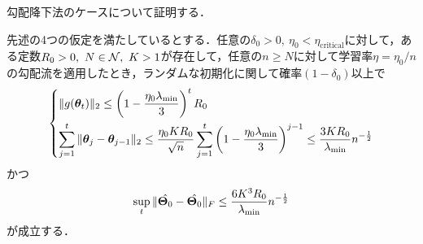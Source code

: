 勾配降下法のケースについて証明する．
\begin{thm}[勾配降下法]
    \label{thm:ntk_gd}
    先述の4つの仮定を満たしているとする．任意の$\delta_0 > 0, \ \eta_0 < \eta_{\mathrm{critical}}$に対して，ある定数$R_0 > 0, \ N \in \mathcal{N}, \ K > 1$が存在して，任意の$n \geq N$に対して学習率$\eta = \eta_0 / n$の勾配流を適用したとき，ランダムな初期化に関して確率$(1- \delta_0)$以上で
    \begin{align}
        \label{eq:a3_1}
        \begin{dcases}
            \|g(\bm{\theta}_t)\|_2 \leq \left(1 - \dfrac{\eta_0 \lambda_{\min}}{3}\right)^t R_0 \\
            \sum_{j=1}^t \|\bm{\theta}_j - \bm{\theta}_{j-1}\|_2 \leq \dfrac{\eta_0 KR_0}{\sqrt{n}} \sum_{j=1}^t \left(1 - \dfrac{\eta_0 \lambda_{\min}}{3}\right)^{j-1} \leq \dfrac{3KR_0}{\lambda_{\min}}n^{-\frac{1}{2}}
        \end{dcases}
    \end{align}
    かつ
    \begin{align}
        \label{eq:a3_2}
        \sup_t \|\hat{\bm{\Theta}_0} - \hat{\bm{\Theta}_0}\|_F \leq \dfrac{6K^3 R_0}{\lambda_{\min}}n^{-\frac{1}{2}}
    \end{align}
    が成立する．
\end{thm}
